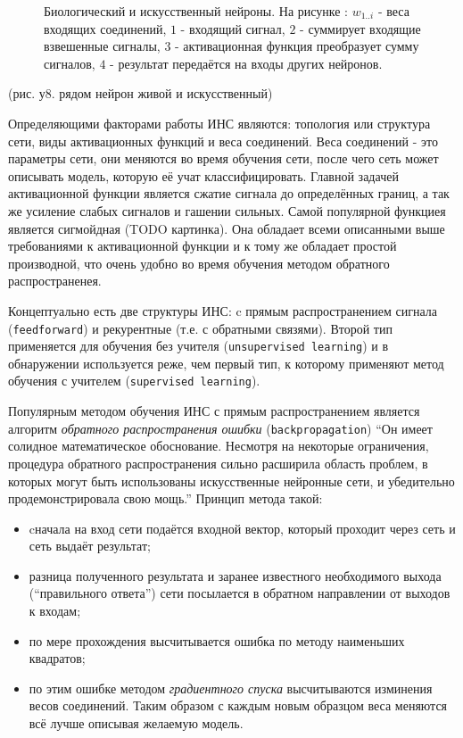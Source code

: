 \documentclass[12pt]{report}
\newenvironment{myItemize}{
	\begin{itemize}
  		\setlength{\itemsep}{1pt}
  		\setlength{\parskip}{0pt}
  		\setlength{\parsep}{0pt}
}{\end{itemize}}
\begin{document}
\begin{figure}[h]
	\centering
	\caption{Биологический  и искусственный  нейроны. На рисунке : $w_{1..i}$ - веса входящих соединений, $1$ - входящий сигнал, $2$ - суммирует входящие взвешенные сигналы, $3$ - активационная функция преобразует сумму сигналов, $4$ - результат передаётся на входы других нейронов.}
	\label{fig:neurons}
\end{figure}

(рис. у8. рядом нейрон живой и искусственный)

Определяющими факторами работы ИНС являются: топология или структура сети, виды активационных функций и веса соединений. Веса соединений - это параметры сети, они меняются во время обучения сети, после чего сеть может описывать модель, которую её учат классифицировать. Главной задачей активационной функции является сжатие сигнала до определённых границ, а так же усиление слабых сигналов и гашении сильных. Самой популярной функциея является сигмойдная (TODO картинка). Она обладает всеми описанными выше требованиями к активационной функции и к тому же обладает простой производной, что очень удобно во время обучения методом обратного распространенея. \citep{wasserman1989neural}

Концептуально есть две структуры ИНС: c прямым распространением сигнала (\texttt{feedforward}) и рекурентные (т.е. с обратными связями). Второй тип применяется для обучения без учителя (\texttt{unsupervised learning}) и в обнаружении используется реже, чем первый тип, к которому применяют метод обучения с учителем (\texttt{supervised learning}).

Популярным методом обучения ИНС с прямым распространением является алгоритм \emph{обратного распространения ошибки} (\texttt{backpropagation}) ``Он имеет солидное математическое обоснование. Несмотря на некоторые ограничения, процедура обратного распространения сильно расширила область проблем, в которых могут быть использованы искусственные нейронные сети, и убедительно продемонстрировала свою мощь.'' \citep{wasserman1989neural} Принцип метода такой: 
\begin{myItemize}
\item cначала на вход сети подаётся входной вектор, который проходит через сеть и сеть выдаёт результат;
\item разница полученного результата и заранее известного необходимого выхода (``правильного ответа'') сети посылается в обратном направлении от выходов к входам;
\item по мере прохождения высчитывается ошибка по методу наименьших квадратов;
\item по этим ошибке методом \emph{градиентного спуска} высчитываются изминения весов соединений. Таким образом с каждым новым образцом веса меняются всё лучше описывая желаемую модель.
\end{myItemize}
\end{document}

